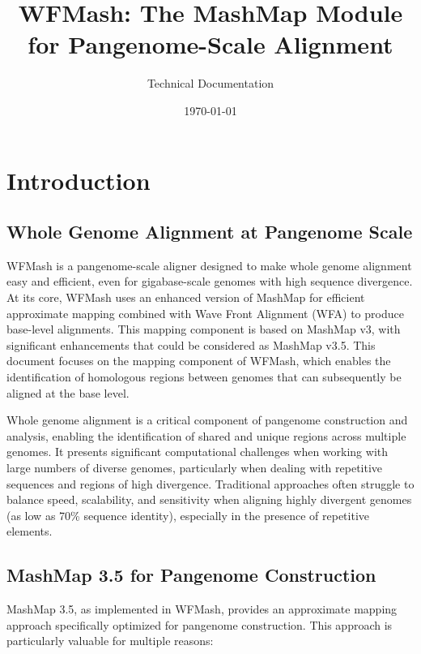 \documentclass{article}
\title{WFMash: The MashMap Module for Pangenome-Scale Alignment}
\author{Technical Documentation}
\date{\today}
\begin{document}
\maketitle
\tableofcontents
\newpage

\section{Introduction}
\subsection{Whole Genome Alignment at Pangenome Scale}

WFMash is a pangenome-scale aligner designed to make whole genome alignment easy and efficient, even for gigabase-scale genomes with high sequence divergence. At its core, WFMash uses an enhanced version of MashMap for efficient approximate mapping combined with Wave Front Alignment (WFA) to produce base-level alignments. This mapping component is based on MashMap v3, with significant enhancements that could be considered as MashMap v3.5. This document focuses on the mapping component of WFMash, which enables the identification of homologous regions between genomes that can subsequently be aligned at the base level.

Whole genome alignment is a critical component of pangenome construction and analysis, enabling the identification of shared and unique regions across multiple genomes. It presents significant computational challenges when working with large numbers of diverse genomes, particularly when dealing with repetitive sequences and regions of high divergence. Traditional approaches often struggle to balance speed, scalability, and sensitivity when aligning highly divergent genomes (as low as 70\% sequence identity), especially in the presence of repetitive elements.

\subsection{MashMap 3.5 for Pangenome Construction}

MashMap 3.5, as implemented in WFMash, provides an approximate mapping approach specifically optimized for pangenome construction. This approach is particularly valuable for multiple reasons:
\end{document}
